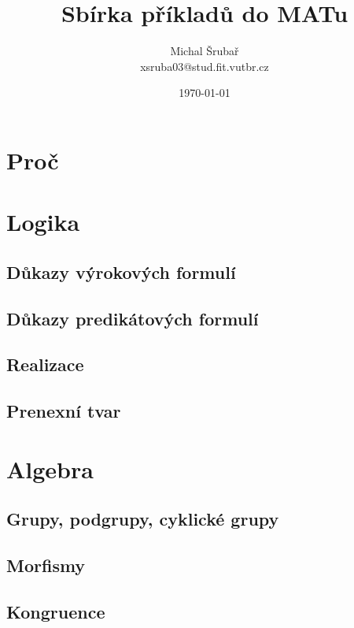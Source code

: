 \documentclass[12pt,a4paper,notitlepage,final]{article}
\author{Michal Šrubař\\xsruba03@stud.fit.vutbr.cz}
\date{\today}
\title{Sbírka příkladů do MATu}
\begin{document}
\maketitle


\section{Proč} \label{proc}

\section{Logika} \label{logika}
\subsection{Důkazy výrokových formulí}        
\subsection{Důkazy predikátových formulí}     
\subsection{Realizace}                        
\subsection{Prenexní tvar}                    

\section{Algebra}
\subsection{Grupy, podgrupy, cyklické grupy}  
\subsection{Morfismy}                         
\subsection{Kongruence}                       
\end{document}
